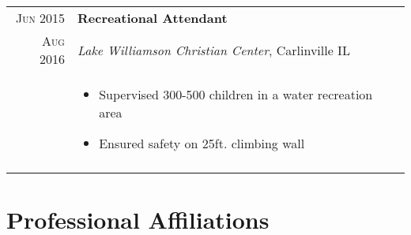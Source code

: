 \documentclass[a4paper,10pt]{article}
\newcommand{\br}{\\\multicolumn{2}{c}{}}
\begin{document}
\begin{tabular}{r|p{15cm}}
    \textsc{Jun 2015} & \textbf{Recreational Attendant} \\
    \textsc{Aug 2016}          & \textit{Lake Williamson Christian Center}, Carlinville IL \\ &
    \begin{itemize}
    \item{Supervised 300-500 children in a water recreation area}
    \item{Ensured safety on 25ft. climbing wall}

    \end{itemize} \br\\

\end{tabular}


\section{Professional Affiliations}
\end{document}
